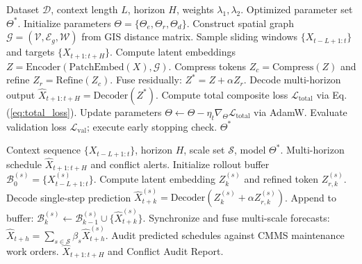 \documentclass[11pt,a4paper]{article}
\begin{document}
\begin{algorithm}[h]
\caption{End-to-End Training Procedure for ConstrumindNet}\label{alg:train}
\begin{algorithmic}[1]
\Require Dataset $\mathcal{D}$, context length $L$, horizon $H$, weights $\lambda_1, \lambda_2$.
\Ensure Optimized parameter set $\Theta^*$.
\State Initialize parameters $\Theta = \{\Theta_e, \Theta_r, \Theta_d\}$.
\State Construct spatial graph $\mathcal{G} = (\mathcal{V}, \mathcal{E}_g, \mathcal{W})$ from GIS distance matrix.
        \State Sample sliding windows $\{X_{t-L+1:t}\}$ and targets $\{X_{t+1:t+H}\}$.
        \State Compute latent embeddings $Z = \text{Encoder}(\text{PatchEmbed}(X), \mathcal{G})$.
        \State Compress tokens $Z_c = \text{Compress}(Z)$ and refine $Z_r = \text{Refine}(Z_c)$.
        \State Fuse residually: $Z^* = Z + \alpha Z_r$.
        \State Decode multi-horizon output $\widehat{X}_{t+1:t+H} = \text{Decoder}(Z^*)$.
        \State Compute total composite loss $\mathcal{L}_{\text{total}}$ via Eq. (\ref{eq:total_loss}).
        \State Update parameters $\Theta \leftarrow \Theta - \eta_t \nabla_\Theta \mathcal{L}_{\text{total}}$ via AdamW.
    \EndFor
    \State Evaluate validation loss $\mathcal{L}_{\text{val}}$; execute early stopping check.
\EndFor
\State \Return $\Theta^*$
\end{algorithmic}
\end{algorithm}

\begin{algorithm}[h]
\caption{Multi-Scale Iterative Forecasting with Latent Refinement}\label{alg:infer}
\begin{algorithmic}[1]
\Require Context sequence $\{X_{t-L+1:t}\}$, horizon $H$, scale set $\mathcal{S}$, model $\Theta^*$.
\Ensure Multi-horizon schedule $\widehat{X}_{t+1:t+H}$ and conflict alerts.
    \State Initialize rollout buffer $\mathcal{B}_0^{(s)} = \{X_{t-L+1:t}^{(s)}\}$.
        \State Compute latent embedding $Z_k^{(s)}$ and refined token $Z_{r, k}^{(s)}$.
        \State Decode single-step prediction $\widehat{X}_{t+k}^{(s)} = \text{Decoder}(Z_k^{(s)} + \alpha Z_{r, k}^{(s)})$.
        \State Append to buffer: $\mathcal{B}_k^{(s)} \leftarrow \mathcal{B}_{k-1}^{(s)} \cup \{\widehat{X}_{t+k}^{(s)}\}$.
    \EndFor
\EndFor
\State Synchronize and fuse multi-scale forecasts: $\widehat{X}_{t+h} = \sum_{s \in \mathcal{S}} \beta_s \widehat{X}_{t+h}^{(s)}$.
\State Audit predicted schedules against CMMS maintenance work orders.
\State \Return $\widehat{X}_{t+1:t+H}$ and Conflict Audit Report.
\end{algorithmic}
\end{algorithm}
\end{document}

